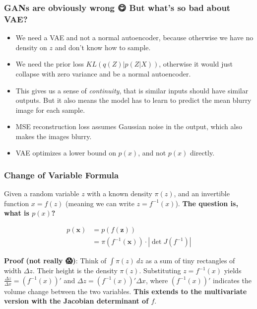 \documentclass{beamer}
\begin{document}
\begin{frame}
  \frametitle{GANs are obviously wrong {\DejaSans 😋} But what's so bad about VAE?}

  \begin{itemize}
    \item We need a VAE and not a normal autoencoder, because otherwise
      we have no density on $z$ and don't know how to sample.

    \item We need the prior loss $KL(q(Z) | p(Z | X))$, otherwise it would
      just collapse with zero variance and be a normal autoencoder.

    \item This gives us a sense of \emph{continuity}, that is similar
      inputs should have similar outputs. But it also means the model
      has to learn to predict the mean blurry image for each sample.

    \item MSE reconstruction loss assumes Gaussian noise in the output,
      which also makes the images blurry.

    \item VAE optimizes a lower bound on $p(x)$, and not $p(x)$ directly.
  \end{itemize}
\end{frame}

\begin{frame}
  \frametitle{Change of Variable Formula}

  Given a random variable $z$ with a known density $\pi(z)$, and an invertible
  function $x = f(z)$ (meaning we can write $z = f^{-1}(x)$).  \textbf{The question is,
  what is $p(x)$?}

  \begin{align}
    p(\textbf{x}) &= p(f(\textbf{z})) \\
                  &= \pi(f^{-1}(\textbf{x})) \cdot |\det{J(f^{-1})}|
  \end{align}

  \textbf{Proof (not really {\DejaSans 😱})}: Think of $\int \pi(z)\ dz$ as a
  sum of tiny rectangles of width $\Delta z$. Their height is the density
  $\pi(z)$. Substituting $z = f^{-1}(x)$ yields $\frac{\Delta z}{\Delta x} =
  (f^{-1}(x))'$ and $\Delta z = (f^{-1}(x))' \Delta x$, where $(f^{-1}(x))'$
  indicates the volume change between the two variables. \textbf{This extends
  to the multivariate version with the Jacobian determinant of $f$}.
\end{frame}
\end{document}
